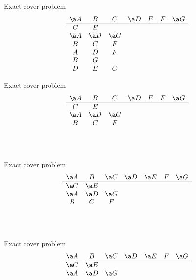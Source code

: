 \documentclass[xcolor=svgnames]{beamer}
\begin{document}
%
\begin{frame}{Exact cover problem} 
  $$
  \begin{array}{ccccccc}
    \a A & B & C & \a D & E & F & \a G\\
    \hline
    C & E &&&&&\\
    \a A & \a D & \a G &&&&\\
    B & C & F &&&&\\
    A & D & F &&&&\\
    B & G &&&&&\\
    D & E & G &&&&
  \end{array}
  $$
\end{frame}

%
\begin{frame}{Exact cover problem} 
  $$
  \begin{array}{ccccccc}
    \a A & B & C & \a D & E & F & \a G\\
    \hline
    C & E &&&&&\\
    \a A & \a D & \a G &&&&\\
    B & C & F &&&&\\
    &&&&&&\\
    &&&&&&\\
    &&&&&&
  \end{array}
  $$
\end{frame}

%
\begin{frame}{Exact cover problem} 
  $$
  \begin{array}{ccccccc}
    \a A & B & \a C & \a D & \a E & F & \a G\\
    \hline
    \a C & \a E &&&&&\\
    \a A & \a D & \a G &&&&\\
    B & C & F &&&&\\
    &&&&&&\\
    &&&&&&\\
    &&&&&&
  \end{array}
  $$
\end{frame}

%
\begin{frame}{Exact cover problem} 
  $$
  \begin{array}{ccccccc}
    \a A & B & \a C & \a D & \a E & F & \a G\\
    \hline
    \a C & \a E &&&&&\\
    \a A & \a D & \a G &&&&\\
    &&&&&&\\
    &&&&&&\\
    &&&&&&\\
    &&&&&&
  \end{array}
  $$
\end{frame}
\end{document}
